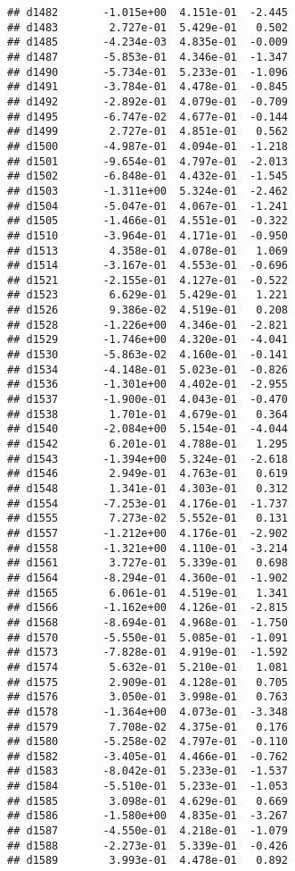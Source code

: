 \documentclass[
]{article}
\begin{document}
\begin{verbatim}
## d1482       -1.015e+00  4.151e-01  -2.445
## d1483        2.727e-01  5.429e-01   0.502
## d1485       -4.234e-03  4.835e-01  -0.009
## d1487       -5.853e-01  4.346e-01  -1.347
## d1490       -5.734e-01  5.233e-01  -1.096
## d1491       -3.784e-01  4.478e-01  -0.845
## d1492       -2.892e-01  4.079e-01  -0.709
## d1495       -6.747e-02  4.677e-01  -0.144
## d1499        2.727e-01  4.851e-01   0.562
## d1500       -4.987e-01  4.094e-01  -1.218
## d1501       -9.654e-01  4.797e-01  -2.013
## d1502       -6.848e-01  4.432e-01  -1.545
## d1503       -1.311e+00  5.324e-01  -2.462
## d1504       -5.047e-01  4.067e-01  -1.241
## d1505       -1.466e-01  4.551e-01  -0.322
## d1510       -3.964e-01  4.171e-01  -0.950
## d1513        4.358e-01  4.078e-01   1.069
## d1514       -3.167e-01  4.553e-01  -0.696
## d1521       -2.155e-01  4.127e-01  -0.522
## d1523        6.629e-01  5.429e-01   1.221
## d1526        9.386e-02  4.519e-01   0.208
## d1528       -1.226e+00  4.346e-01  -2.821
## d1529       -1.746e+00  4.320e-01  -4.041
## d1530       -5.863e-02  4.160e-01  -0.141
## d1534       -4.148e-01  5.023e-01  -0.826
## d1536       -1.301e+00  4.402e-01  -2.955
## d1537       -1.900e-01  4.043e-01  -0.470
## d1538        1.701e-01  4.679e-01   0.364
## d1540       -2.084e+00  5.154e-01  -4.044
## d1542        6.201e-01  4.788e-01   1.295
## d1543       -1.394e+00  5.324e-01  -2.618
## d1546        2.949e-01  4.763e-01   0.619
## d1548        1.341e-01  4.303e-01   0.312
## d1554       -7.253e-01  4.176e-01  -1.737
## d1555        7.273e-02  5.552e-01   0.131
## d1557       -1.212e+00  4.176e-01  -2.902
## d1558       -1.321e+00  4.110e-01  -3.214
## d1561        3.727e-01  5.339e-01   0.698
## d1564       -8.294e-01  4.360e-01  -1.902
## d1565        6.061e-01  4.519e-01   1.341
## d1566       -1.162e+00  4.126e-01  -2.815
## d1568       -8.694e-01  4.968e-01  -1.750
## d1570       -5.550e-01  5.085e-01  -1.091
## d1573       -7.828e-01  4.919e-01  -1.592
## d1574        5.632e-01  5.210e-01   1.081
## d1575        2.909e-01  4.128e-01   0.705
## d1576        3.050e-01  3.998e-01   0.763
## d1578       -1.364e+00  4.073e-01  -3.348
## d1579        7.708e-02  4.375e-01   0.176
## d1580       -5.258e-02  4.797e-01  -0.110
## d1582       -3.405e-01  4.466e-01  -0.762
## d1583       -8.042e-01  5.233e-01  -1.537
## d1584       -5.510e-01  5.233e-01  -1.053
## d1585        3.098e-01  4.629e-01   0.669
## d1586       -1.580e+00  4.835e-01  -3.267
## d1587       -4.550e-01  4.218e-01  -1.079
## d1588       -2.273e-01  5.339e-01  -0.426
## d1589        3.993e-01  4.478e-01   0.892

\end{verbatim}
\end{document}
